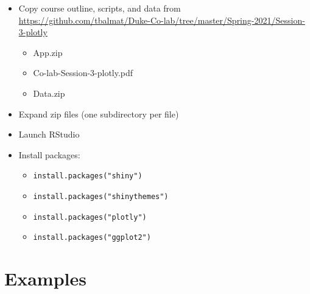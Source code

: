 \documentclass[10pt, letterpaper]{article}
\begin{document}
\begin{spacing}{1.0}
\begin{itemize}[noitemsep]
    \item Copy course outline, scripts, and data from \url{https://github.com/tbalmat/Duke-Co-lab/tree/master/Spring-2021/Session-3-plotly}
    \begin{itemize}[noitemsep]
        \item App.zip
        \item Co-lab-Session-3-plotly.pdf
        \item Data.zip
    \end{itemize}
    \item Expand zip files (one subdirectory per file)
    \item Launch RStudio
    \item Install packages:
    \begin{itemize}[noitemsep]
        \item \texttt{install.packages("shiny")}
        \item \texttt{install.packages("shinythemes")}
        \item \texttt{install.packages("plotly")}
        \item \texttt{install.packages("ggplot2")}
    \end{itemize}
\end{itemize}


\section{Examples}\label{sec:examples}


\end{spacing}
\end{document}
